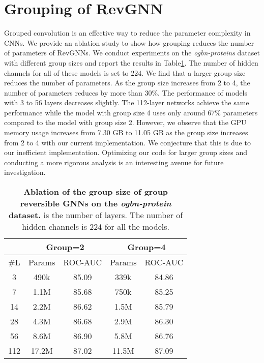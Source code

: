 \documentclass{article}
\newcommand{\tblLabel}{Table\xspace}
\begin{document}



\clearpage
\appendix
\section{Grouping of RevGNN}
Grouped convolution is an effective way to reduce the parameter complexity in CNNs. We provide an ablation study to show how grouping reduces the number of parameters of RevGNNs. We conduct experiments on the \textit{ogbn-proteins} dataset with different group sizes and report the results in \tblLabel \ref{table:group}. The number of hidden channels for all of these models is set to 224. We find that a larger group size reduces the number of parameters. As the group size increases from 2 to 4, the number of parameters reduces by more than 30\%. The performance of models with 3 to 56 layers decreases slightly. The 112-layer networks achieve the same performance while the model with group size 4 uses only around 67\% parameters compared to the model with group size 2. However, we observe that the GPU memory usage increases from 7.30 GB to 11.05 GB as the group size increases from 2 to 4 with our current implementation. We conjecture that this is due to our inefficient implementation. Optimizing our code for larger group sizes and conducting a more rigorous analysis is an interesting avenue for future investigation.

\begin{table}[ht]
\vspace{-8pt}
\centering
\setlength{\tabcolsep}{5pt}
\caption{\textbf{Ablation of the group size of group reversible GNNs on the \textit{ogbn-protein} dataset.}  is the number of layers. The number of hidden channels is 224 for all the models.}
\vspace{2pt}
\begin{tabular}{c|cc|cc}
\toprule
  \label{table:group}
  \centering
  &  \multicolumn{2}{c|}{Group=2} & \multicolumn{2}{c}{Group=4} \\
\midrule
\#L & Params & ROC-AUC  & Params & ROC-AUC \\
\midrule
3 & 490k & 85.09 & 339k & 84.86 \\
7 & 1.1M & 85.68 & 750k & 85.25 \\
14 & 2.2M & 86.62 & 1.5M & 85.79 \\
28 & 4.3M & 86.68 & 2.9M & 86.30 \\
56 & 8.6M & 86.90 & 5.8M & 86.76 \\
112 & 17.2M & 87.02 & 11.5M & 87.09 \\
\bottomrule
\end{tabular}
\end{table}
\end{document}
